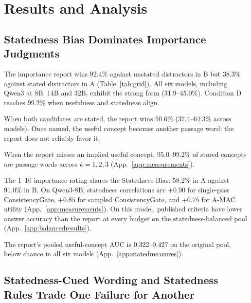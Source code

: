\section{Results and Analysis}\label{sec:results}\label{sec:recall}\label{sec:diagnosis}

\subsection{Statedness Bias Dominates Importance Judgments}\label{sec:bias}\label{sec:gap}



The importance report wins 92.4\% against unstated distractors in B but 38.3\% against stated distractors in A (Table~\ref{tab:grid}). All six models, including Qwen3 at 8B, 14B and 32B, exhibit the strong form (31.9--45.0\%). Condition D reaches 99.2\% when usefulness and statedness align.

When both candidates are stated, the report wins 50.6\% (37.4--64.3\% across models). Once named, the useful concept becomes another passage word; the report does not reliably favor it.

When the report misses an implied useful concept, 95.0--99.2\% of stored concepts are passage words across $k=1,2,3$ (App.~\ref{app:measurements}).

The 1--10 importance rating shares the Statedness Bias: 58.2\% in A against 91.0\% in B. On Qwen3-8B, statedness correlations are $+0.90$ for single-pass ConsistencyGate, $+0.85$ for sampled ConsistencyGate, and $+0.75$ for A-MAC utility (App.~\ref{app:measurements}). On this model, published criteria have lower answer accuracy than the report at every budget on the statedness-balanced pool (App.~\ref{app:balancedresults}).

The report's pooled useful-concept AUC is 0.322--0.427 on the original pool, below chance in all six models (App.~\ref{app:statedmeasures}).

\subsection{Statedness-Cued Wording and Statedness Rules Trade One Failure for Another}\label{sec:tradeoff}

